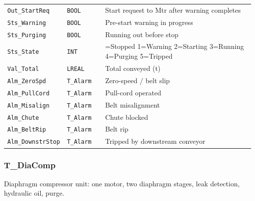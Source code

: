 {\begin{longtable}{@{}>{\raggedright\arraybackslash}p{3.4cm}>{\raggedright\arraybackslash}p{3.3cm}>{\raggedright\arraybackslash}p{1.3cm}>{\raggedright\arraybackslash}p{6.4cm}@{}}
\texttt{Out\_StartReq} & \texttt{BOOL} &  & Start request to Mtr after warning completes \\
\texttt{Sts\_Warning} & \texttt{BOOL} &  & Pre-start warning in progress \\
\texttt{Sts\_Purging} & \texttt{BOOL} &  & Running out before stop \\
\texttt{Sts\_State} & \texttt{INT} &  & 0=Stopped 1=Warning 2=Starting 3=Running 4=Purging 5=Tripped \\
\texttt{Val\_Total} & \texttt{LREAL} &  & Total conveyed (t) \\
\texttt{Alm\_ZeroSpd} & \texttt{T\_Alarm} &  & Zero-speed /\allowbreak{} belt slip \\
\texttt{Alm\_PullCord} & \texttt{T\_Alarm} &  & Pull-cord operated \\
\texttt{Alm\_Misalign} & \texttt{T\_Alarm} &  & Belt misalignment \\
\texttt{Alm\_Chute} & \texttt{T\_Alarm} &  & Chute blocked \\
\texttt{Alm\_BeltRip} & \texttt{T\_Alarm} &  & Belt rip \\
\texttt{Alm\_DownstrStop} & \texttt{T\_Alarm} &  & Tripped by downstream conveyor \\
\bottomrule
\end{longtable}
}
\subsubsection*{T\_DiaComp}
\label{app:pclib:tdiacomp}
Diaphragm compressor unit: one motor, two diaphragm stages, leak detection, hydraulic oil, purge.

